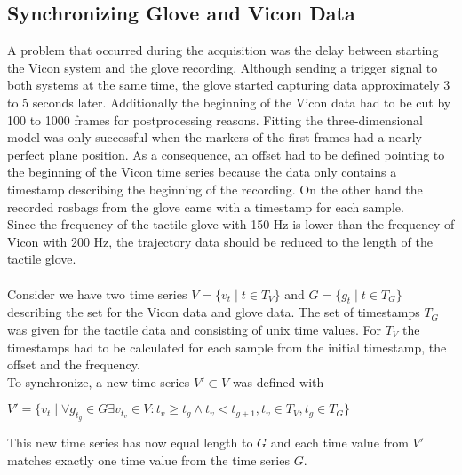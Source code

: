 \subsection{Synchronizing Glove and Vicon Data}
A problem that occurred during the acquisition was the delay between starting the Vicon system and the glove recording. Although sending a trigger signal to both systems at the same time, the glove started capturing data approximately 3 to 5 seconds later. Additionally the beginning of the Vicon data had to be cut by 100 to 1000 frames for postprocessing reasons. Fitting the three-dimensional model was only successful when the markers of the first frames had a nearly perfect plane position. As a consequence, an offset had to be defined pointing to the beginning of the Vicon time series because the data only contains a timestamp describing the beginning of the recording. On the other hand the recorded rosbags from the glove came with a timestamp for each sample.\\
Since the frequency of the tactile glove with 150 Hz is lower than the frequency of Vicon with 200 Hz, the trajectory data should be reduced to the length of the tactile glove.\\
\\
Consider we have two time series $V = \{v_{t} \mid t\in T_{V}\}$ and $G = \{g_{t} \mid t\in T_{G}\}$ describing the set for the Vicon data and glove data. The set of timestamps $T_{G}$ was given for the tactile data and consisting of unix time values. For $T_{V}$ the timestamps had to be calculated for each sample from the initial timestamp, the offset and the frequency. \\
To synchronize, a new time series $V' \subset V$ was defined with \begin{center}
$V' = \{v_{t} \mid \forall g_{t_{g}} \in G \exists v_{t_{v}} \in V : t_{v} \geq t_{g} \wedge t_{v} < t_{g+1}, t_{v} \in T_{V}, t_{g} \in T_{G} \}$
\end{center}
This new time series has now equal length to $G$ and each time value from $V'$ matches exactly one time value from the time series $G$.
